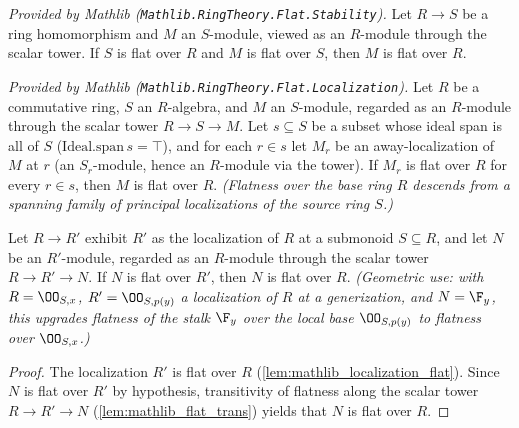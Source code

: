 \begin{lemma}
  \label{lem:mathlib_flat_trans}
  \mathlibok
  \textit{Provided by Mathlib (\texttt{Mathlib.RingTheory.Flat.Stability}).}
  Let \(R \to S\) be a ring homomorphism and \(M\) an \(S\)-module, viewed as an
  \(R\)-module through the scalar tower. If \(S\) is flat over \(R\) and \(M\) is
  flat over \(S\), then \(M\) is flat over \(R\).
\end{lemma}

\begin{lemma}
  \label{lem:mathlib_flat_of_isLocalized_span}
  \mathlibok
  \textit{Provided by Mathlib (\texttt{Mathlib.RingTheory.Flat.Localization}).}
  Let \(R\) be a commutative ring, \(S\) an \(R\)-algebra, and \(M\) an \(S\)-module,
  regarded as an \(R\)-module through the scalar tower \(R \to S \to M\). Let
  \(s \subseteq S\) be a subset whose ideal span is all of \(S\)
  (\(\mathrm{Ideal.span}\,s = \top\)), and for each \(r \in s\) let \(M_r\) be an
  away-localization of \(M\) at \(r\) (an \(S_r\)-module, hence an \(R\)-module via the
  tower). If \(M_r\) is flat over \(R\) for every \(r \in s\), then \(M\) is flat over
  \(R\). \emph{(Flatness over the base ring \(R\) descends from a spanning family of
  principal localizations of the \emph{source} ring \(S\).)}
\end{lemma}

\begin{lemma}

  \label{lem:gf_stalk_flat_localBase}
  Let \(R \to R'\) exhibit \(R'\) as the localization of \(R\) at a submonoid
  \(S \subseteq R\), and let \(N\) be an \(R'\)-module, regarded as an \(R\)-module
  through the scalar tower \(R \to R' \to N\). If \(N\) is flat over \(R'\), then \(N\)
  is flat over \(R\). \emph{(Geometric use: with \(R = \OO_{S,x}\),
  \(R' = \OO_{S,p(y)}\) a localization of \(R\) at a generization, and \(N = \F_y\), this
  upgrades flatness of the stalk \(\F_y\) over the local base \(\OO_{S,p(y)}\) to flatness
  over \(\OO_{S,x}\).)}
\end{lemma}

\begin{proof}
  \leanok
  The localization \(R'\) is flat over \(R\) (\cref{lem:mathlib_localization_flat}). Since
  \(N\) is flat over \(R'\) by hypothesis, transitivity of flatness along the scalar tower
  \(R \to R' \to N\) (\cref{lem:mathlib_flat_trans}) yields that \(N\) is flat over \(R\).
\end{proof}

